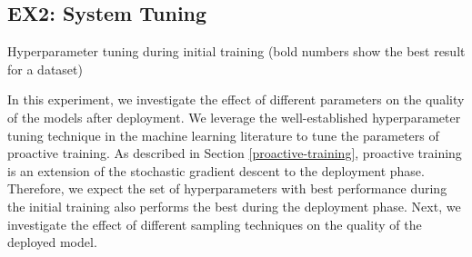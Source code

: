 \subsection{EX2: System Tuning}
\begin{table*}[t]
\centering
\begin{adjustbox}{max width=\textwidth}

\end{adjustbox}
\caption{Hyperparameter tuning during initial training (bold numbers show the best result for a dataset)}
\label{hyper-param-table}
\end{table*}

In this experiment, we investigate the effect of different parameters on the quality of the models after deployment.
We leverage the well-established hyperparameter tuning technique in the machine learning literature to tune the parameters of proactive training.
As described in Section \ref{proactive-training}, proactive training is an extension of the stochastic gradient descent to the deployment phase.
Therefore, we expect the set of hyperparameters with best performance during the initial training also performs the best during the deployment phase.
Next, we investigate the effect of different sampling techniques on the quality of the deployed model.

